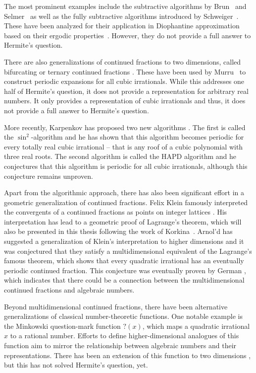 The most prominent examples include the subtractive algorithms by
Brun~\cite{Brun19} and Selmer~\cite{Selmer67}
as well as the fully subtractive algorithms introduced by Schweiger~\cite{Schweiger95}.
These have been analyzed for their application in Diophantine approximation
based on their ergodic properties~\cite{Schweiger04}.
However, they do not provide a full answer to Hermite's question.

There are also generalizations of continued fractions to two dimensions,
called bifurcating or ternary continued fractions \cite{Gupta00,Daus22}.
These have been used by Murru~\cite{Murru15} to construct periodic expansions
for all cubic irrationals.
While this addresses one half of Hermite’s question,
it does not provide a representation for arbitrary real numbers.
It only provides a representation of cubic irrationals
and thus, it does not provide a full answer to Hermite's question.

More recently, Karpenkov has proposed two new algorithms \cite{Karpenkov24, Karpenkov21}.
The first is called the $\sin^2$-algorithm and he has shown that this algorithm
becomes periodic for every totally real cubic irrational -- that is any roof of
a cubic polynomial with three real roots.
The second algorithm is called the HAPD algorithm \cite{Karpenkov24} and he
conjectures that this algorithm is periodic for all cubic irrationals,
although this conjecture remains unproven.

Apart from the algorithmic approach,
there has also been significant effort in a geometric generalization of
continued fractions.
Felix Klein famously interpreted the convergents of a continued fractions as
points on integer lattices \cite{Klein95}.
His interpretation has lead to a geometric proof of Lagrange’s theorem, which
will also be presented in this thesis following the work of Korkina~\cite{Korkina96}.
Arnol'd has suggested a generalization of Klein's interpretation to higher
dimensions \cite{Arnold98} and it was conjectured that they satisfy a
multidimensional equivalent of the Lagrange's famous theorem,
which shows that every quadratic irrational has an eventually periodic
continued fraction.
This conjecture was eventually proven by German \cite{German08},
which indicates that there could be a connection between the multidimensional
continued fractions and algebraic numbers.

Beyond multidimensional continued fractions, there have been alternative
generalizations of classical number-theoretic functions.
One notable example is the Minkowski question-mark function $?(x)$,
which maps a quadratic irrational $x$ to a rational number.
Efforts to define higher-dimensional analogues of this function aim to mirror
the relationship between algebraic numbers and their representations.
There has been an extension of this function to two dimensions \cite{Beaver04},
but this has not solved Hermite's question, yet.

